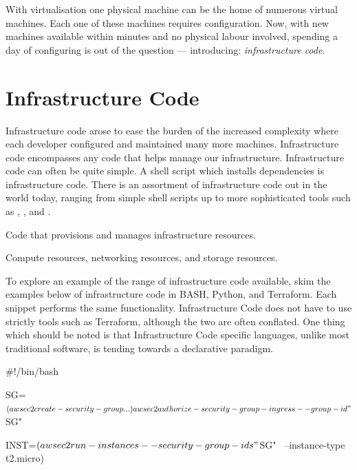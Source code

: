 With virtualisation one physical machine can be the home of numerous virtual machines.
Each one of these machines requires configuration.
Now, with new machines available within minutes and no physical labour involved,
spending a day of configuring is out of the question
--- introducing: \textsl{infrastructure code}.


\section{Infrastructure Code}

Infrastructure code arose to ease the burden of the increased complexity where each developer configured and maintained many more machines.
Infrastructure code encompasses any code that helps manage our infrastructure.
Infrastructure code can often be quite simple.
A shell script which installs dependencies is infrastructure code.
There is an assortment of infrastructure code out in the world today,
ranging from simple shell scripts up to more sophisticated tools such as ,
, and .

\begin{definition}
Code that provisions and manages infrastructure resources.
\end{definition}

\begin{definition}
Compute resources, networking resources, and storage resources.
\end{definition}

To explore an example of the range of infrastructure code available,
skim the examples below of infrastructure code in BASH, Python, and Terraform.
Each snippet performs the same functionality.
Infrastructure Code does not have to use strictly tools such as Terraform,
although the two are often conflated.
One thing which should be noted is that Infrastructure Code specific languages,
unlike most traditional software,
is tending towards a declarative paradigm.

\begin{code}[language=bash]{}
#!/bin/bash

SG=$(aws ec2 create-security-group ...)

aws ec2 authorize-security-group-ingress --group-id "$SG"

INST=$(aws ec2 run-instances --security-group-ids "$SG" \
            --instance-type t2.micro)
\end{code}

